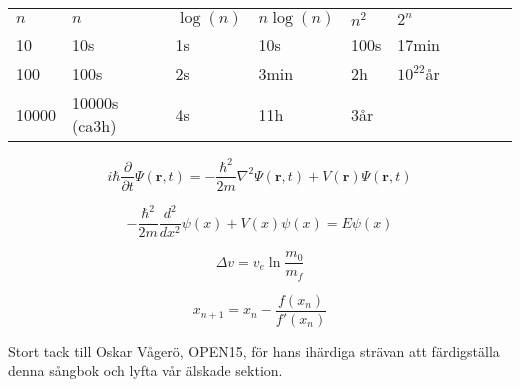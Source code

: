 
\begin{tabular}{@{}ll@{}ll@{}ll@{}ll@{}ll@{}}
$n$ & $n$ & $\log(n)$ & $n\log(n)$ & $n^2$ & $2^n$\\
10  & 10s & 1s & 10s & 100s & 17min \\
100 & 100s & 2s & 3min & 2h & $10^22$år \\
10000  & 10000s (ca3h) & 4s & 11h & 3år\\
\end{tabular}


\begin{equation}
i \hbar \frac{\partial}{\partial t} \Psi (\textbf{r},t) = - \frac{\hbar^2}{2m} \nabla^2 \Psi (\textbf{r},t) + V(\textbf{r}) \Psi (\textbf{r},t)
\end{equation}

\begin{equation}
- \frac{\hbar^2}{2m} \frac{d^2}{d x^2} \psi (x) + V(x) \psi (x) = E \psi (x)
\end{equation}


\begin{equation}
\Delta v = v_e \ln \frac{m_0}{m_f}
\end{equation}


\begin{equation}
x_{n+1} = x_n - \frac{f(x_n)}{f'(x_n)}
\end{equation}

\newpage

\hspace{2cm}

Stort tack till Oskar Vågerö, OPEN15, för hans ihärdiga strävan att färdigställa denna sångbok och lyfta vår älskade sektion.
